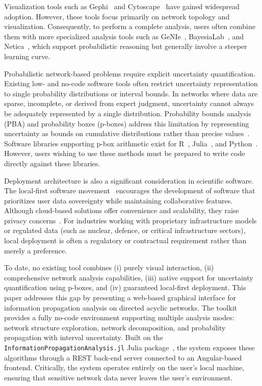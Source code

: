 \documentclass[conference]{IEEEtran}
\begin{document}
Visualization tools such as Gephi~\cite{bastian2009gephi} and Cytoscape~\cite{shannon2003cytoscape} have gained widespread adoption. However, these tools focus primarily on network topology and visualization. Consequently, to perform a complete analysis, users often combine them with more specialized analysis tools such as GeNIe~\cite{druzdzel1999genie}, BayesiaLab~\cite{bayesialab}, and Netica~\cite{norsys1998netica}, which support probabilistic reasoning but generally involve a steeper learning curve.

Probabilistic network-based problems require explicit uncertainty quantification. Existing low- and no-code software tools often restrict uncertainty representation to single probability distributions or interval bounds. In networks where data are sparse, incomplete, or derived from expert judgment, uncertainty cannot always be adequately represented by a single distribution. Probability bounds analysis (PBA) and probability boxes (p-boxes) address this limitation by representing uncertainty as bounds on cumulative distributions rather than precise values~\cite{ferson2003constructing}. Software libraries supporting p-box arithmetic exist for R~\cite{ferson2019pbar}, Julia~\cite{gray2022pba_julia}, and Python~\cite{gray2022pba}. However, users wishing to use these methods must be prepared to write code directly against these libraries. 

Deployment architecture is also a significant consideration in scientific software. The local-first software movement~\cite{kleppmann2019local} encourages the development of  software that prioritizes user data sovereignty while maintaining collaborative features. Although cloud-based solutions offer convenience and scalability, they raise privacy concerns~\cite{hashizume2013analysis}. For industries working with proprietary infrastructure models or regulated data (such as nuclear, defence, or critical infrastructure sectors), local deployment is often a regulatory or contractual requirement rather than merely a preference.

To date, no existing tool combines (i) purely visual interaction, (ii) comprehensive network analysis capabilities, (iii) native support for uncertainty quantification using p-boxes, and (iv) guaranteed local-first deployment. This paper addresses this gap by presenting a web-based graphical interface for information propagation analysis on directed acyclic networks. The toolkit provides a fully no-code environment supporting multiple analysis modes: network structure exploration, network decomposition, and probability propagation with interval uncertainty. Built on the \texttt{InformationPropagationAnalysis.jl} Julia package~\cite{infoprop2024}, the system exposes these algorithms through a REST back-end server connected to an Angular-based frontend. Critically, the system operates entirely on the user's local machine, ensuring that sensitive network data never leaves the user's environment.
\end{document}
